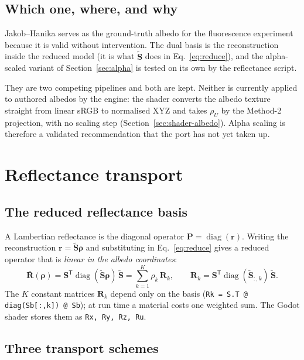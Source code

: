 \documentclass[11pt,a4paper]{article}
\newcommand{\mS}{\mathbf{S}}
\newcommand{\mSd}{\tilde{\mathbf{S}}}
\newcommand{\mR}{\mathbf{R}}
\newcommand{\mRb}{\bar{\mathbf{R}}}
\newcommand{\mP}{\mathbf{P}}
\newcommand{\vr}{\mathbf{r}}
\newcommand{\vrho}{\boldsymbol{\rho}}
\newcommand{\diag}{\operatorname{diag}}
\newcommand{\transp}{^{\mathsf{T}}}
\newcommand{\code}[1]{\texttt{#1}}
\begin{document}
\subsection{Which one, where, and why}

Jakob--Hanika serves as the ground-truth albedo for the fluorescence
experiment because it is valid without intervention.  The dual basis is the
reconstruction inside the reduced model (it is what $\mSd$ does in
Eq.~\eqref{eq:reduce}), and the alpha-scaled variant of
Section~\ref{sec:alpha} is tested on its own by the reflectance script.

They are two competing pipelines and both are kept.  Neither is currently
applied to authored albedos by the engine: the shader converts the albedo
texture straight from linear sRGB to normalised XYZ and takes $\rho_U$ by the
Method-2 projection, with no scaling step
(Section~\ref{sec:shader-albedo}).  Alpha scaling is therefore a validated
recommendation that the port has not yet taken up.

\section{Reflectance transport}
\label{sec:reflectance}

\subsection{The reduced reflectance basis}

A Lambertian reflectance is the diagonal operator $\mP = \diag(\vr)$.  Writing
the reconstruction $\vr = \mSd\vrho$ and substituting in Eq.~\eqref{eq:reduce}
gives a reduced operator that is \emph{linear in the albedo coordinates}:
\begin{equation}
  \mRb(\vrho) = \mS\transp\diag(\mSd\vrho)\,\mSd
              = \sum_{k=1}^{K} \rho_k\,\mR_k,
  \qquad
  \mR_k = \mS\transp\diag(\mSd_{:,k})\,\mSd .
  \label{eq:Rk}
\end{equation}
The $K$ constant matrices $\mR_k$ depend only on the basis
(\code{Rk = S.T @ diag(Sb[:,k]) @ Sb}); at run time a material costs one
weighted sum.  The Godot shader stores them as \code{Rx, Ry, Rz, Ru}.

\subsection{Three transport schemes}
\end{document}
